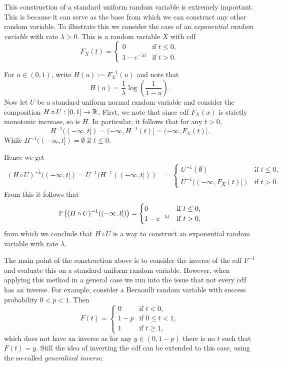 This construction of a standard uniform random variable is extremely important. This is because it can serve as the base from which we can construct any other random variable. To illustrate this we consider the case of an \emph{exponential random variable} with rate $\lambda > 0$. This is a random variable $X$ with cdf
\[
	F_X(t) = \begin{cases}
		0 &\text{if } t \le 0,\\
		1-e^{-\lambda t} &\text{if } t > 0.
	\end{cases}
\]

For $u \in (0,1)$, write $H(u) := F_X^{-1}(u)$ and note that
\[
	H(u) = \frac{1}{\lambda} \log\left(\frac{1}{1-u}\right).
\]
Now let $U$ be a standard uniform normal random variable and consider the composition $H \circ U : [0,1] \to \mathbb R$. First, we note that since cdf $F_X(x)$ is strictly monotonic increase, so is $H$. In particular, it follows that for any $t > 0$,
\[
	H^{-1}((-\infty,t]) = (-\infty, H^{-1}(t)] = (-\infty, F_X(t)].
\]
While $H^{-1}((-\infty,t]) = \emptyset$ if $t \le 0$.

Hence we get
\begin{align*}
	(H \circ U)^{-1}((-\infty, t]) = U^{-1}(H^{-1}((-\infty, t]))
	&= \begin{cases}
		U^{-1}(\emptyset) &\text{if } t \le 0,\\
		U^{-1}((-\infty, F_X(t)]) &\text{if } t > 0.
	\end{cases}
\end{align*}
From this it follows that 
\[
	\mathbb P\left((H \circ U)^{-1}((-\infty, t])\right) = \begin{cases}
			0 &\text{if } t \le 0,\\
			1-e^{-\lambda t} &\text{if } t > 0,
		\end{cases}
\]
from which we conclude that $H \circ U$ is a way to construct an exponential random variable with rate $\lambda$.

The main point of the construction above is to consider the inverse of the cdf $F^{-1}$ and evaluate this on a standard uniform random variable. However, when applying this method in a general case we run into the issue that not every cdf has an inverse. For example, consider a Bernoulli random variable with success probability $0 < p < 1$. Then
\[
	F(t) = \begin{cases}
		0 &\text{if } t < 0, \\
		1-p &\text{if } 0 \le t < 1, \\
		1 &\text{if } t \ge 1,
	\end{cases}
\] 
which does not have an inverse as for any $y \in (0,1-p)$ there is no $t$ such that $F(t) = y$. Still the idea of inverting the cdf can be extended to this case, using the so-called \emph{generalized inverse}. 

